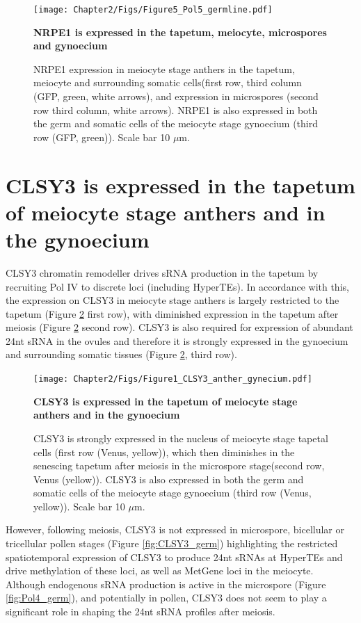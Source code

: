 \begin{figure}[htbp!] 
\centering    
    \texttt{[image: Chapter2/Figs/Figure5\_Pol5\_germline.pdf]}
\caption{\textbf{NRPE1 is expressed in the tapetum, meiocyte, microspores and gynoecium}}
\label{fig:Pol5_germ}
\captionsetup{font=small}
    \caption*{NRPE1 expression in meiocyte stage anthers in the tapetum, meiocyte and surrounding somatic cells(first row, third column (GFP, green, white arrows), and expression in microspores (second row third column, white arrows). NRPE1 is also expressed in both the germ and somatic cells of the meiocyte stage gynoecium (third row (GFP, green)). Scale bar 10 $\mu$m.}
\end{figure}


\section{CLSY3 is expressed in the tapetum of meiocyte stage anthers and in the gynoecium}

CLSY3 chromatin remodeller drives sRNA production in the tapetum \citep{RN187} by recruiting Pol IV to discrete loci (including HyperTEs)\citep{RN23}. In accordance with this, the expression on CLSY3 in meiocyte stage anthers is largely restricted to the tapetum (Figure \ref{fig:CLSY3_anther} first row), with diminished expression in the tapetum after meiosis (Figure \ref{fig:CLSY3_anther} second row). CLSY3 is also required for expression of abundant 24nt sRNA in the ovules and therefore it is strongly expressed in the gynoecium and surrounding somatic tissues (Figure \ref{fig:CLSY3_anther}, third row).

\begin{figure}[htbp!] 
\centering    
    \texttt{[image: Chapter2/Figs/Figure1\_CLSY3\_anther\_gynecium.pdf]}
\caption{\textbf{CLSY3 is expressed in the tapetum of meiocyte stage anthers and in the gynoecium}}
\label{fig:CLSY3_anther}
\captionsetup{font=small}
    \caption*{CLSY3 is strongly expressed in the nucleus of meiocyte stage tapetal cells (first row (Venus, yellow)), which then diminishes in the senescing tapetum after meiosis in the microspore stage(second row, Venus (yellow)). CLSY3 is also expressed in both the germ and somatic cells of the meiocyte stage gynoecium (third row (Venus, yellow)). Scale bar 10 $\mu$m.}
\end{figure}

However, following meiosis, CLSY3 is not expressed in microspore, bicellular or tricellular pollen stages (Figure \ref{fig:CLSY3_germ}) highlighting the restricted spatiotemporal expression of CLSY3 to produce 24nt sRNAs at HyperTEs and drive methylation of these loci, as well as MetGene loci in the meiocyte. Although endogenous sRNA production is active in the microspore (Figure \ref{fig:Pol4_germ}), and potentially in pollen, CLSY3 does not seem to play a significant role in shaping the 24nt sRNA profiles after meiosis.

